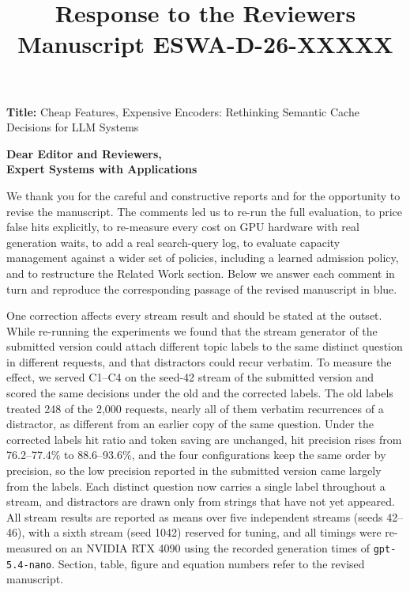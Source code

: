 \documentclass[11pt]{article}
\title{Response to the Reviewers \\ Manuscript ESWA-D-26-XXXXX}
\author{}
\date{}
\begin{document}
\maketitle

\noindent\textbf{Title:} Cheap Features, Expensive Encoders: Rethinking Semantic Cache Decisions for LLM Systems

\bigskip
\noindent \textbf{Dear Editor and Reviewers,\\
Expert Systems with Applications}

We thank you for the careful and constructive reports and for the opportunity to revise the manuscript. The comments led us to re-run the full evaluation, to price false hits explicitly, to re-measure every cost on GPU hardware with real generation waits, to add a real search-query log, to evaluate capacity management against a wider set of policies, including a learned admission policy, and to restructure the Related Work section. Below we answer each comment in turn and reproduce the corresponding passage of the revised manuscript in blue.

One correction affects every stream result and should be stated at the outset. While re-running the experiments we found that the stream generator of the submitted version could attach different topic labels to the same distinct question in different requests, and that distractors could recur verbatim. To measure the effect, we served C1--C4 on the seed-42 stream of the submitted version and scored the same decisions under the old and the corrected labels. The old labels treated 248 of the 2,000 requests, nearly all of them verbatim recurrences of a distractor, as different from an earlier copy of the same question. Under the corrected labels hit ratio and token saving are unchanged, hit precision rises from 76.2--77.4\% to 88.6--93.6\%, and the four configurations keep the same order by precision, so the low precision reported in the submitted version came largely from the labels. Each distinct question now carries a single label throughout a stream, and distractors are drawn only from strings that have not yet appeared. All stream results are reported as means over five independent streams (seeds 42--46), with a sixth stream (seed 1042) reserved for tuning, and all timings were re-measured on an NVIDIA RTX 4090 using the recorded generation times of \texttt{gpt-5.4-nano}. Section, table, figure and equation numbers refer to the revised manuscript.

\end{document}
